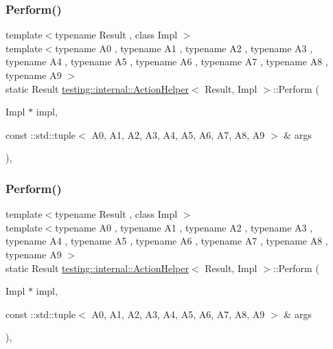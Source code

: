 \mbox{\label{classtesting_1_1internal_1_1_action_helper_af746a8fa9d26f9eb72a7ea34e939c866}} 
\subsubsection{\texorpdfstring{Perform()}{Perform()}\hspace{0.1cm}{\footnotesize\ttfamily [21/33]}}
{\footnotesize\ttfamily template$<$typename Result , class Impl $>$ \\
template$<$typename A0 , typename A1 , typename A2 , typename A3 , typename A4 , typename A5 , typename A6 , typename A7 , typename A8 , typename A9 $>$ \\
static Result \mbox{\hyperlink{classtesting_1_1internal_1_1_action_helper}{testing\+::internal\+::\+Action\+Helper}}$<$ Result, Impl $>$\+::Perform (\begin{DoxyParamCaption}\item[{Impl $\ast$}]{impl,  }\item[{const \+::std\+::tuple$<$ A0, A1, A2, A3, A4, A5, A6, A7, A8, A9 $>$ \&}]{args }\end{DoxyParamCaption})\hspace{0.3cm}{\ttfamily [inline]}, {\ttfamily [static]}}

\mbox{\label{classtesting_1_1internal_1_1_action_helper_af746a8fa9d26f9eb72a7ea34e939c866}} 
\subsubsection{\texorpdfstring{Perform()}{Perform()}\hspace{0.1cm}{\footnotesize\ttfamily [22/33]}}
{\footnotesize\ttfamily template$<$typename Result , class Impl $>$ \\
template$<$typename A0 , typename A1 , typename A2 , typename A3 , typename A4 , typename A5 , typename A6 , typename A7 , typename A8 , typename A9 $>$ \\
static Result \mbox{\hyperlink{classtesting_1_1internal_1_1_action_helper}{testing\+::internal\+::\+Action\+Helper}}$<$ Result, Impl $>$\+::Perform (\begin{DoxyParamCaption}\item[{Impl $\ast$}]{impl,  }\item[{const \+::std\+::tuple$<$ A0, A1, A2, A3, A4, A5, A6, A7, A8, A9 $>$ \&}]{args }\end{DoxyParamCaption})\hspace{0.3cm}{\ttfamily [inline]}, {\ttfamily [static]}}

